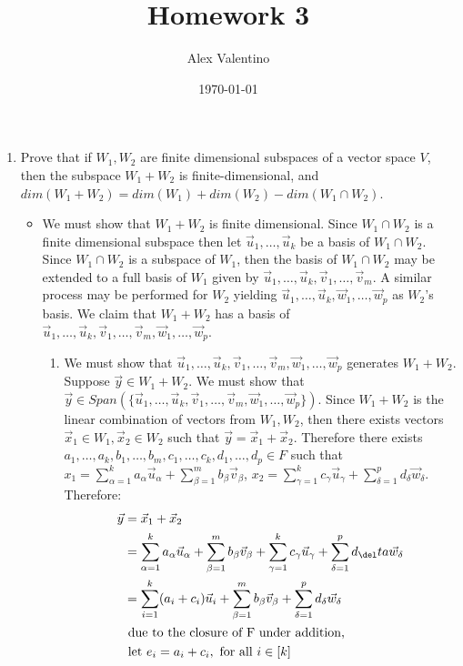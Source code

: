 \documentclass[12pt, letterpaper]{article}
\date{\today}
\author{Alex Valentino}
\title{Homework 3}
\begin{document}
	\begin{enumerate}
		\item  Prove that if $W_1, W_2$ are finite dimensional subspaces of a vector space $V$, then the subspace $W_1 + W_2$ is finite-dimensional, and $dim(W_1 + W_2) = dim(W_1) + dim(W_2) - dim(W_1 \cap W_2)$.
		\begin{itemize}
			\item We must show that $W_1 + W_2$ is finite dimensional.  Since $W_1 \cap W_2$ is a finite dimensional subspace then let $\Vec{u}_1, \ldots, \Vec{u}_k$ be a basis of $W_1 \cap W_2$.  Since $W_1 \cap W_2$ is a subspace of $W_1$, then the basis of $W_1 \cap W_2$ may be extended to a full basis of $W_1$ given by $\Vec{u}_1, \ldots, \Vec{u}_k, \Vec{v}_1,\ldots, \Vec{v}_m$.  A similar process may be performed for $W_2$ yielding $\Vec{u}_1, \ldots, \Vec{u}_k, \Vec{w}_1,\ldots, \Vec{w}_p$ as $W_2$'s basis.  We claim that $W_1 + W_2$ has a basis of $\Vec{u}_1, \ldots, \Vec{u}_k, \Vec{v}_1,\ldots, \Vec{v}_m, \Vec{w}_1,\ldots, \Vec{w}_p$.  
		\begin{enumerate}
		\item We must show that $\Vec{u}_1, \ldots, \Vec{u}_k, \Vec{v}_1,\ldots, \Vec{v}_m, \Vec{w}_1,\ldots, \Vec{w}_p$ generates $W_1 + W_2$.  Suppose $\Vec{y}  \in W_1 + W_2$.  We must show that $\Vec{y} \in Span(\{\Vec{u}_1, \ldots, \Vec{u}_k, \Vec{v}_1,\ldots, \Vec{v}_m, \Vec{w}_1,\ldots, \Vec{w}_p\})$. Since $W_1 + W_2$ is the linear combination of vectors from $W_1, W_2$, then there exists vectors $\Vec{x}_1 \in W_1, \Vec{x}_2 \in W_2$ such that $\Vec{y} = \Vec{x}_1 + \Vec{x}_2$.  Therefore there exists $a_1,\ldots, a_k, b_1, \ldots, b_m, c_1, \ldots, c_k, d_1,\ldots, d_p \in F$ such that $x_1 = \sum_{\alpha =1}^k a_\alpha \Vec{u}_\alpha + \sum_{\beta = 1}^m b_\beta \Vec{v}_\beta$, $x_2 = \sum_{\gamma =1}^k c_\gamma \Vec{u}_\gamma + \sum_{\delta = 1}^p d_\delta \Vec{w}_\delta$.  Therefore: 
		\begin{align*}
			\Vec{y} &= \Vec{x}_1 + \Vec{x}_2\\
			&= \sum_{\alpha =1}^k a_\alpha \Vec{u}_\alpha + \sum_{\beta = 1}^m b_\beta \Vec{v}_\beta + \sum_{\gamma =1}^k c_\gamma \Vec{u}_\gamma + \sum_{\delta = 1}^p d_\del	ta \Vec{w}_\delta \\
			&= \sum_{i=1}^k (a_i + c_i) \Vec{u}_i +  \sum_{\beta = 1}^m b_\beta \Vec{v}_\beta + \sum_{\delta = 1}^p d_\delta \Vec{w}_\delta\\
			&\text{ due to the closure of F under addition,}\\
			&\text{ let }	 e_i = a_i + c_i, \text{ for all } i \in [k]\\

\end{align*}
\end{enumerate}
\end{itemize}
\end{enumerate}
\end{document}
